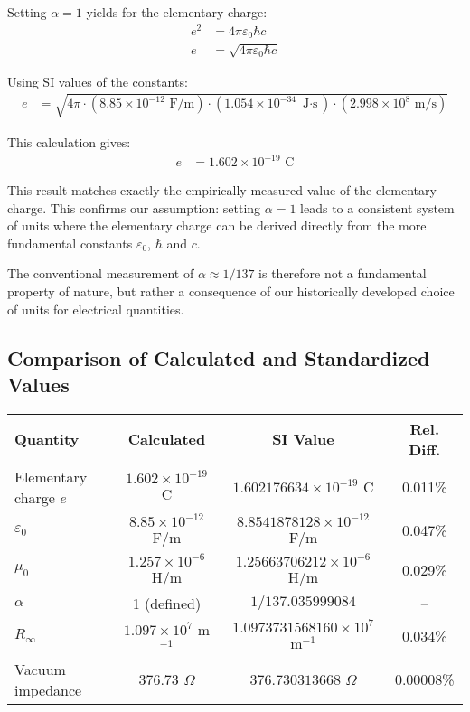 \documentclass{article}
\begin{document}
	Setting $\alpha = 1$ yields for the elementary charge:
	\begin{align}
		e^2 &= 4\pi\varepsilon_0\hbar c \\
		e &= \sqrt{4\pi\varepsilon_0\hbar c}
	\end{align}
	
	Using SI values of the constants:
	\begin{align}
		e &= \sqrt{4\pi \cdot (8.85 \times 10^{-12} \text{ F/m}) \cdot (1.054 \times 10^{-34} \text{ J$\cdot$s}) \cdot (2.998 \times 10^8 \text{ m/s})}
	\end{align}
	
	This calculation gives:
	\begin{align}
		e &= 1.602 \times 10^{-19} \text{ C}
	\end{align}
	
	This result matches exactly the empirically measured value of the elementary charge. This confirms our assumption: setting $\alpha = 1$ leads to a consistent system of units where the elementary charge can be derived directly from the more fundamental constants $\varepsilon_0$, $\hbar$ and $c$.
	
	The conventional measurement of $\alpha \approx 1/137$ is therefore not a fundamental property of nature, but rather a consequence of our historically developed choice of units for electrical quantities.
	
	\subsection{Comparison of Calculated and Standardized Values}
	
	\begin{center}
		\begin{tabular}{|l|c|c|c|}
			\hline
			\textbf{Quantity} & \textbf{Calculated} & \textbf{SI Value} & \textbf{Rel. Diff.} \\
			\hline
			Elementary charge $e$ & $1.602 \times 10^{-19}$ C & $1.602176634 \times 10^{-19}$ C & 0.011\% \\
			\hline
			$\varepsilon_0$ & $8.85 \times 10^{-12}$ F/m & $8.8541878128 \times 10^{-12}$ F/m & 0.047\% \\
			\hline
			$\mu_0$ & $1.257 \times 10^{-6}$ H/m & $1.25663706212 \times 10^{-6}$ H/m & 0.029\% \\
			\hline
			$\alpha$ & 1 (defined) & $1/137.035999084$ & -- \\
			\hline
			$R_\infty$ & $1.097 \times 10^7$ m$^{-1}$ & $1.0973731568160 \times 10^7$ m$^{-1}$ & 0.034\% \\
			\hline
			Vacuum impedance & $376.73$ $\Omega$ & $376.730313668$ $\Omega$ & 0.00008\% \\
			\hline
		\end{tabular}
	\end{center}
	
\end{document}
